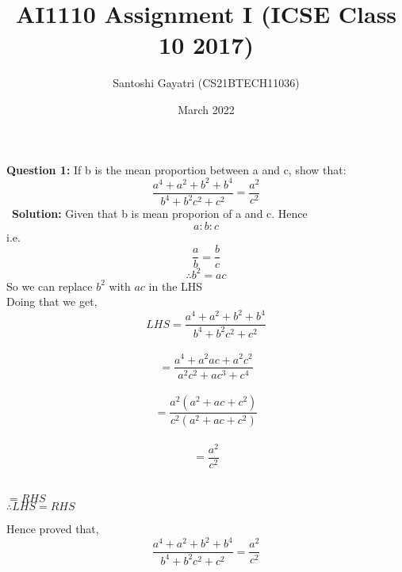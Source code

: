 \documentclass[journal,12pt,twocolumn]{IEEEtran}
\title{AI1110 Assignment I (ICSE Class 10 2017)}
\author{Santoshi Gayatri (CS21BTECH11036)}
\date{March 2022}
\begin{document}
\maketitle
\textbf {Question 1:}
If b is the mean proportion between a and c, show that:
$$ \frac{ a^4 + a^2+b^2 + b^4}{b^4 + b^2c^2 + c^2}=\frac{a^2}{c^2}$$\
\textbf{Solution:}
Given that b is mean proporion of a and c. Hence $$a:b:c$$
i.e. $${\frac{a}{b}=\frac{b}{c} }$$
$${\therefore  b^{2}=ac}$$
So we can replace $b^2$ with $ac$ in the LHS\\
Doing that we get,
$$ {LHS = \frac{ a^4 + a^2+b^2 + b^4}{b^4 + b^2c^2 + c^2}}$$\\
$${ = \frac{ a^4 + a^2ac + a^2c^2}{ a^2c^2 + ac^3 + c ^4}}$$\\
$${ = \frac{a^2(a^2 + ac + c^2)}{c^2(a^2 + ac + c^2)}}$$\\
    $${ = \frac{a^2}{c^2}}$$\\[1pt]
\begin{center}
$=RHS$\\
$\therefore LHS=RHS$
\end{center}
Hence proved that, $$ \frac{ a^4 + a^2+b^2 + b^4}{b^4 + b^2c^2 + c^2}=\frac{a^2}{c^2}$$
\end{document}
